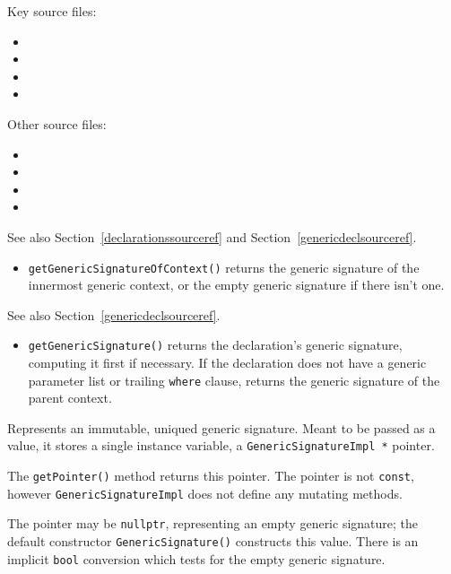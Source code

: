 \documentclass[../generics]{subfiles}
\begin{document}
Key source files:
\begin{itemize}
\item {}
\item {}
\item {}
\item {}
\end{itemize}
Other source files:
\begin{itemize}
\item {}
\item {}
\item {}
\item {}
\end{itemize}

See also Section~\ref{declarationssourceref} and Section~\ref{genericdeclsourceref}.
\begin{itemize}
\item \texttt{getGenericSignatureOfContext()} returns the generic signature of the innermost generic context, or the empty generic signature if there isn't one.
\end{itemize}

See also Section~\ref{genericdeclsourceref}.
\begin{itemize}
\item \texttt{getGenericSignature()} returns the declaration's generic signature, computing it first if necessary. If the declaration does not have a generic parameter list or trailing \texttt{where} clause, returns the generic signature of the parent context.
\end{itemize}

Represents an immutable, uniqued generic signature. Meant to be passed as a value, it stores a single instance variable, a \texttt{GenericSignatureImpl *} pointer.

The \texttt{getPointer()} method returns this pointer. The pointer is not \texttt{const}, however \texttt{GenericSignatureImpl} does not define any mutating methods.

The pointer may be \texttt{nullptr}, representing an empty generic signature; the default constructor \texttt{GenericSignature()} constructs this value. There is an implicit \texttt{bool} conversion which tests for the empty generic signature.
\end{document}
